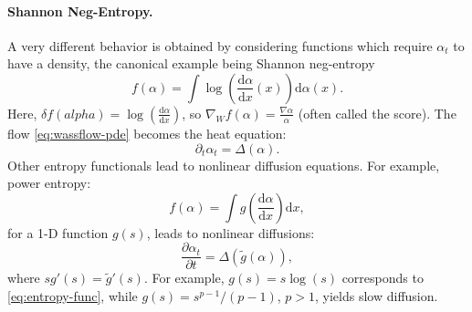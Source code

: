 \paragraph{Shannon Neg-Entropy.} A very different behavior is obtained by considering functions which require $\alpha_t$ to have a density, the canonical example being Shannon neg-entropy
   \begin{equation}
       f(\alpha) = \int \log\left(\frac{\mathrm{d} \alpha}{\mathrm{d} x}(x)\right) \mathrm{d} \alpha(x). \label{eq:entropy-func}
   \end{equation}
   Here, $\delta f(alpha) = \log\left(\frac{\mathrm{d} \alpha}{\mathrm{d} x}\right)$, so $\nabla_W f(\alpha) = \frac{\nabla \alpha}{\alpha}$ (often called the score). The flow \eqref{eq:wassflow-pde} becomes the heat equation:
   \begin{equation}
       \partial_t \alpha_t = \Delta(\alpha).
   \end{equation}
   Other entropy functionals lead to nonlinear diffusion equations. For example, power entropy:
   \begin{equation}
       f(\alpha) = \int g\left(\frac{\mathrm{d} \alpha}{\mathrm{d} x}\right) \mathrm{d} x,
   \end{equation}
   for a 1-D function $g(s)$, leads to nonlinear diffusions:
   \begin{equation}
       \frac{\partial \alpha_t}{\partial t} = \Delta(\tilde{g}(\alpha)),
   \end{equation}
   where $s g'(s) = \tilde{g}'(s)$. For example, $g(s) = s \log(s)$ corresponds to \eqref{eq:entropy-func}, while $g(s) = s^{p-1}/(p-1)$, $p > 1$, yields slow diffusion.

